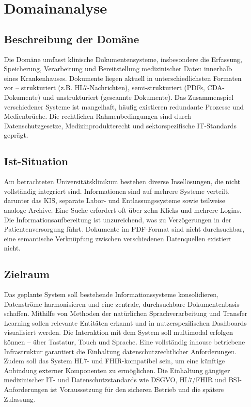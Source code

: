 \let\clearpage\relax
{\chapter{Domainanalyse}
\label{sec:domainanalyse}}
\section{Beschreibung der Domäne}
Die Domäne umfasst klinische Dokumentensysteme, insbesondere die Erfassung, Speicherung, Verarbeitung und Bereitstellung medizinischer Daten innerhalb eines Krankenhauses. 
Dokumente liegen aktuell in unterschiedlichsten Formaten vor – strukturiert (z.B. HL7-Nachrichten), semi-strukturiert (PDFs, CDA-Dokumente) und unstrukturiert (gescannte Dokumente). 
Das Zusammenspiel verschiedener Systeme ist mangelhaft, häufig existieren redundante Prozesse und Medienbrüche. 
Die rechtlichen Rahmenbedingungen sind durch Datenschutzgesetze, Medizinprodukterecht und sektorspezifische IT-Standards geprägt.
\section{Ist-Situation}
Am betrachteten Universitätsklinikum bestehen diverse Insellösungen, die nicht vollständig integriert sind. Informationen sind auf mehrere Systeme verteilt, darunter das KIS, separate Labor- und Entlassungssysteme sowie teilweise analoge Archive. Eine Suche erfordert oft über zehn Klicks und mehrere Logins. Die Informationsaufbereitung ist unzureichend, was zu Verzögerungen in der Patientenversorgung führt. Dokumente im PDF-Format sind nicht durchsuchbar, eine semantische Verknüpfung zwischen verschiedenen Datenquellen existiert nicht.
\section{Zielraum}
Das geplante System soll bestehende Informationssysteme konsolidieren, Datenströme harmonisieren und eine zentrale, durchsuchbare Dokumentenbasis schaffen. 
Mithilfe von Methoden der natürlichen Sprachverarbeitung und Transfer Learning sollen relevante Entitäten erkannt und in nutzerspezifischen Dashboards visualisiert werden. 
Die Interaktion mit dem System soll multimodal erfolgen können – über Tastatur, Touch und Sprache. 
Eine vollständig inhouse betriebene Infrastruktur garantiert die Einhaltung datenschutzrechtlicher Anforderungen. 
Zudem soll das System HL7- und FHIR-kompatibel sein, um eine künftige Anbindung externer Komponenten zu ermöglichen. 
Die Einhaltung gängiger medizinischer IT- und Datenschutzstandards wie DSGVO, HL7/FHIR und BSI-Anforderungen ist Voraussetzung für den sicheren Betrieb und die spätere Zulassung.